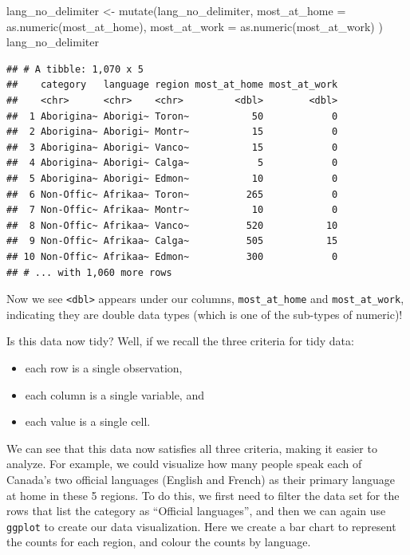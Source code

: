 \documentclass[
]{krantz}
\makeatletter
\newenvironment{Shaded}{\begin{snugshade}}{\end{snugshade}}
\newcommand{\AttributeTok}[1]{\textcolor[rgb]{0.61,0.61,0.61}{#1}}
\newcommand{\FunctionTok}[1]{\textcolor[rgb]{0,0,0}{#1}}
\newcommand{\NormalTok}[1]{#1}
\newcommand{\OtherTok}[1]{\textcolor[rgb]{0.37,0.37,0.37}{#1}}
\providecommand{\tightlist}{%
  \setlength{\itemsep}{0pt}\setlength{\parskip}{0pt}}
\newenvironment{kframe}{%
\medskip{}
\setlength{\fboxsep}{.8em}
 \def\at@end@of@kframe{}%
 \ifinner\ifhmode%
  \def\at@end@of@kframe{\end{minipage}}%
  \begin{minipage}{\columnwidth}%
 \fi\fi%
 \def\FrameCommand##1{\hskip\@totalleftmargin \hskip-\fboxsep
 \colorbox{shadecolor}{##1}\hskip-\fboxsep
     \hskip-\linewidth \hskip-\@totalleftmargin \hskip\columnwidth}%
 \MakeFramed {\advance\hsize-\width
   \@totalleftmargin\z@ \linewidth\hsize
   \@setminipage}}%
 {\par\unskip\endMakeFramed%
 \at@end@of@kframe}
\renewenvironment{Shaded}{\begin{kframe}}{\end{kframe}}
\makeatother
\begin{document}
\begin{Shaded}
\begin{Highlighting}[]
\NormalTok{lang\_no\_delimiter }\OtherTok{\textless{}{-}} \FunctionTok{mutate}\NormalTok{(lang\_no\_delimiter,}
  \AttributeTok{most\_at\_home =} \FunctionTok{as.numeric}\NormalTok{(most\_at\_home),}
  \AttributeTok{most\_at\_work =} \FunctionTok{as.numeric}\NormalTok{(most\_at\_work)}
\NormalTok{)}
\NormalTok{lang\_no\_delimiter}
\end{Highlighting}
\end{Shaded}

\begin{verbatim}
## # A tibble: 1,070 x 5
##    category   language region most_at_home most_at_work
##    <chr>      <chr>    <chr>         <dbl>        <dbl>
##  1 Aborigina~ Aborigi~ Toron~           50            0
##  2 Aborigina~ Aborigi~ Montr~           15            0
##  3 Aborigina~ Aborigi~ Vanco~           15            0
##  4 Aborigina~ Aborigi~ Calga~            5            0
##  5 Aborigina~ Aborigi~ Edmon~           10            0
##  6 Non-Offic~ Afrikaa~ Toron~          265            0
##  7 Non-Offic~ Afrikaa~ Montr~           10            0
##  8 Non-Offic~ Afrikaa~ Vanco~          520           10
##  9 Non-Offic~ Afrikaa~ Calga~          505           15
## 10 Non-Offic~ Afrikaa~ Edmon~          300            0
## # ... with 1,060 more rows
\end{verbatim}

Now we see \texttt{\textless{}dbl\textgreater{}} appears under our columns, \texttt{most\_at\_home} and \texttt{most\_at\_work}, indicating they are double data types (which is one of the sub-types of numeric)!

Is this data now tidy? Well, if we recall the three criteria for tidy data:

\begin{itemize}
\tightlist
\item
  each row is a single observation,
\item
  each column is a single variable, and
\item
  each value is a single cell.
\end{itemize}

We can see that this data now satisfies all three criteria, making it easier to analyze.
For example, we could visualize how many people speak each of Canada's two
official languages (English and French) as their primary language at home in
these 5 regions. To do this, we first need to filter the data set for the
rows that list the category as ``Official languages'', and then we can again use
\texttt{ggplot} to create our data visualization. Here we create a bar chart to
represent the counts for each region, and colour the counts by language.
\end{document}
